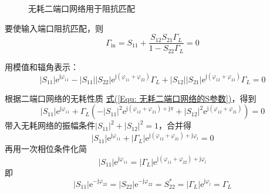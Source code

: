 \begin{tcbproof}
\begin{wrapfigure}[4]{r}{0.5\textwidth}
\begin{center}
            \end{center}
            \vspace{-20pt}
            \caption{无耗二端口网络用于阻抗匹配}\label{Fig: 无耗二端口网络用于阻抗匹配}
        \end{wrapfigure} 
        要使输入端口阻抗匹配，则
        \begin{equation}
            \varGamma_\mathrm{in}=S_{11}+\frac{S_{12}S_{21}\varGamma_L}{1-S_{22}\varGamma_L}=0
        \end{equation}

        用模值和辐角表示：
        \begin{equation}
            |S_{11}|\mathrm{e}^{\mathrm{j}\varphi_{11}}-|S_{11}||S_{22}|\mathrm{e}^{\mathrm{j}(\varphi_{11}+\varphi_{22})}\varGamma_L+|S_{12}||S_{21}|\mathrm{e}^{\mathrm{j}(\varphi_{12}+\varphi_{21})}\varGamma_L=0
        \end{equation}

        根据二端口网络的无耗性质 \hyperref[Equ: 无耗二端口网络的S参数]{式(\ref*{Equ: 无耗二端口网络的S参数})}，得到
        \begin{equation}
            |S_{11}|\mathrm{e}^{\mathrm{j}\varphi_{11}}+\varGamma_L\left(-|S_{11}|^2\mathrm{e}^{\mathrm{j}(\varphi_{12}+\varphi_{21})+\mathrm{j}\pi}+|S_{12}|^2\mathrm{e}^{\mathrm{j}(\varphi_{12}+\varphi_{21})}\right)=0
        \end{equation}
        带入无耗网络的振幅条件$|S_{11}|^2+|S_{12}|^2=1$，合并得
        \begin{equation}
            |S_{11}|\mathrm{e}^{\mathrm{j}\varphi_{11}}+|\varGamma_L|\mathrm{e}^{\mathrm{j}(\varphi_{12}+\varphi_{21})+\mathrm{j}\varphi_l}=0
        \end{equation}
        再用一次相位条件化简
        \begin{equation}
            |S_{11}|\mathrm{e}^{\mathrm{j}\varphi_{11}}=|\varGamma_L|\mathrm{e}^{\mathrm{j}(\varphi_{11}+\varphi_{22})+\mathrm{j}\varphi_l}
        \end{equation}
        即
        \begin{equation}
            |S_{11}|\mathrm{e}^{-\mathrm{j}\varphi_{22}}
            =|S_{22}|\mathrm{e}^{-\mathrm{j}\varphi_{22}}
            =S_{22}^*
            =|\varGamma_L|\mathrm{e}^{\mathrm{j}\varphi_l}
            =\varGamma_L
        \end{equation}
    \end{tcbproof}

